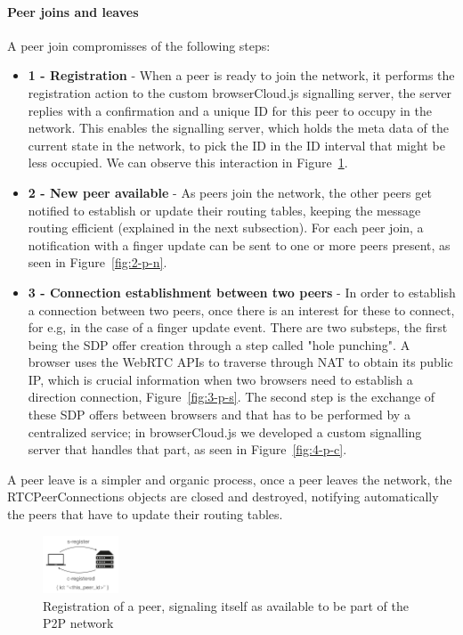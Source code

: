 \paragraph{Peer joins and leaves} A peer join compromisses of the following steps:

\begin{itemize}
    \item \textbf{1 - Registration} - When a peer is ready to join the network, it performs the registration action to the custom browserCloud.js signalling server, the server replies with a confirmation and a unique ID for this peer to occupy in the network. This enables the signalling server, which holds the meta data of the current state in the network, to pick the ID in the ID interval that might be less occupied. We can observe this interaction in Figure~\ref{fig:1-p-r}.
    \item \textbf{2 - New peer available} - As peers join the network, the other peers get notified to establish or update their routing tables, keeping the message routing efficient (explained in the next subsection). For each peer join, a notification with a finger update can be sent to one or more peers present, as seen in Figure~\ref{fig:2-p-n}.
    \item \textbf{3 - Connection establishment between two peers} - In order to establish a connection between two peers, once there is an interest for these to connect, for e.g, in the case of a finger update event. There are two substeps, the first being the SDP offer creation through a step called "hole punching". A browser uses the WebRTC APIs to traverse through NAT to obtain its public IP, which is crucial information when two browsers need to establish a direction connection, Figure~\ref{fig:3-p-s}. The second step is the exchange of these SDP offers between browsers and that has to be performed by a centralized service; in browserCloud.js we developed a custom signalling server that handles that part, as seen in Figure~\ref{fig:4-p-c}.
\end{itemize}

A peer leave is a simpler and organic process, once a peer leaves the network, the RTCPeerConnections objects are closed and destroyed, notifying automatically the peers that have to update their routing tables.

\begin{figure}[h!]
  \centering
  \includegraphics[width=0.2\textwidth]{figs/1-peer-registers}
  \caption{Registration of a peer, signaling itself as available to be part of the P2P network}
  \label{fig:1-p-r}
\end{figure}

